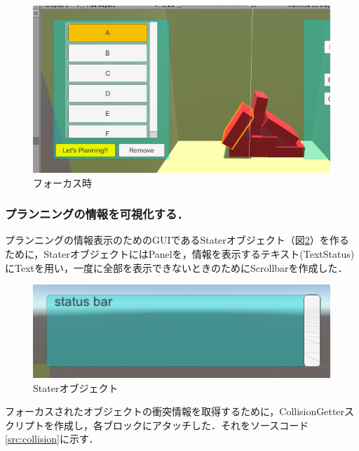 \documentclass[12pt]{jarticle}
\begin{document}
\begin{figure}[!hbt]
  \begin{center}
    \includegraphics[scale=0.5]{images/BWP_Work6/outline2.png}
  \end{center}
  \caption{フォーカス時}
  \label{fig:on}
\end{figure}
\clearpage

\subsubsection{プランニングの情報を可視化する．}
プランニングの情報表示のためのGUIであるStaterオブジェクト（図\ref{fig:stater}）を作るために，StaterオブジェクトにはPanelを，情報を表示するテキスト(TextStatus)にTextを用い，一度に全部を表示できないときのためにScrollbarを作成した\cite{sb}．

\begin{figure}[!hbt]
  \begin{center}
    \includegraphics[scale=0.5]{images/BWP_Work6/stater.png}
  \end{center}
  \caption{Staterオブジェクト}
  \label{fig:stater}
\end{figure}

フォーカスされたオブジェクトの衝突情報を取得するために，CollisionGetterスクリプトを作成し，各ブロックにアタッチした．それをソースコード\ref{src:collision}に示す．
\end{document}
